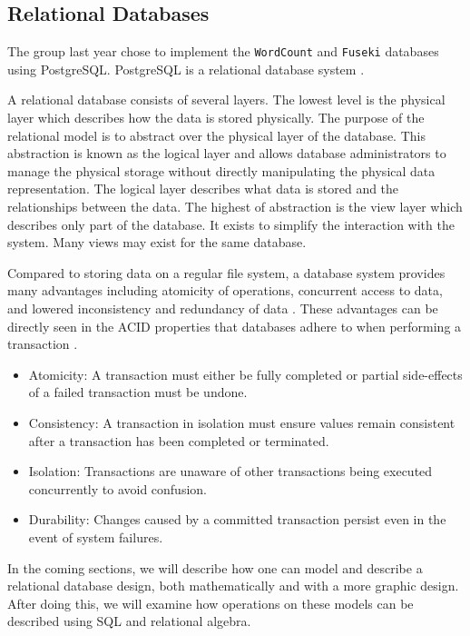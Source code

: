 \subsection{Relational Databases}\label{relational_databases}
The group last year chose to implement the \texttt{WordCount} and \texttt{Fuseki} databases using PostgreSQL.
PostgreSQL is a relational database system \cite{knox2020}.


A relational database consists of several layers.
The lowest level is the physical layer which describes how the data is stored physically.
The purpose of the relational model is to abstract over the physical layer of the database.
This abstraction is known as the logical layer and allows database administrators to manage the physical storage without directly manipulating the physical data representation.
The logical layer describes what data is stored and the relationships between the data.
The highest of abstraction is the view layer which describes only part of the database. It exists to simplify the interaction with the system. Many views may exist for the same database.
\cite{DBSBook}

Compared to storing data on a regular file system, a database system provides many advantages including atomicity of operations, concurrent access to data, and lowered inconsistency and redundancy of data \cite{DBSBook}.
These advantages can be directly seen in the ACID properties that databases adhere to when performing a transaction \cite{DBSBook}.
\begin{itemize} \label{ACID}
    \item Atomicity: A transaction must either be fully completed or partial side-effects of a failed transaction must be undone.
    \item Consistency: A transaction in isolation must ensure values remain consistent after a transaction has been completed or terminated.
    \item Isolation: Transactions are unaware of other transactions being executed concurrently to avoid confusion.
    \item Durability: Changes caused by a committed transaction persist even in the event of system failures.
\end{itemize}

In the coming sections, we will describe how one can model and describe a relational database design, both mathematically and with a more graphic design.
After doing this, we will examine how operations on these models can be described using SQL and relational algebra.

